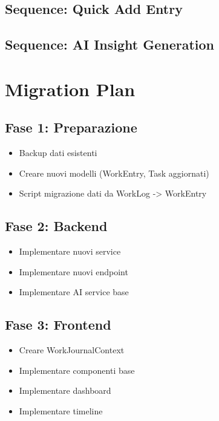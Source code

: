 \documentclass[11pt,a4paper]{article}
\begin{document}
\subsection{Sequence: Quick Add Entry}


\subsection{Sequence: AI Insight Generation}


\newpage

\section{Migration Plan}

\subsection{Fase 1: Preparazione}

\begin{itemize}
    \item [ ] Backup dati esistenti
    \item [ ] Creare nuovi modelli (WorkEntry, Task aggiornati)
    \item [ ] Script migrazione dati da WorkLog -> WorkEntry
\end{itemize}

\subsection{Fase 2: Backend}

\begin{itemize}
    \item [ ] Implementare nuovi service
    \item [ ] Implementare nuovi endpoint
    \item [ ] Implementare AI service base
\end{itemize}

\subsection{Fase 3: Frontend}

\begin{itemize}
    \item [ ] Creare WorkJournalContext
    \item [ ] Implementare componenti base
    \item [ ] Implementare dashboard
    \item [ ] Implementare timeline
\end{itemize}
\end{document}
